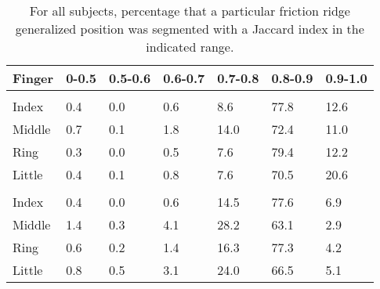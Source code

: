 \documentclass[]{article}
\begin{document}
\begin{table}[!h]

\caption{\label{tab:twoinch-per-frgp-jaccard}For all subjects, percentage that a particular friction ridge generalized position was segmented with a Jaccard index in the indicated range.}
\centering
\begin{tabular}{lllllll}
\toprule
Finger & 0-0.5 & 0.5-0.6 & 0.6-0.7 & 0.7-0.8 & 0.8-0.9 & 0.9-1.0\\
\midrule
\addlinespace[0.3em]
\multicolumn{7}{l}{\textbf{Right}}\\
\rowcolor{gray!6}  \hspace{1em}Index & 0.4 & 0.0 & 0.6 & 8.6 & 77.8 & 12.6\\
\hspace{1em}Middle & 0.7 & 0.1 & 1.8 & 14.0 & 72.4 & 11.0\\
\rowcolor{gray!6}  \hspace{1em}Ring & 0.3 & 0.0 & 0.5 & 7.6 & 79.4 & 12.2\\
\hspace{1em}Little & 0.4 & 0.1 & 0.8 & 7.6 & 70.5 & 20.6\\
\addlinespace[0.3em]
\multicolumn{7}{l}{\textbf{Left}}\\
\rowcolor{gray!6}  \hspace{1em}Index & 0.4 & 0.0 & 0.6 & 14.5 & 77.6 & 6.9\\
\hspace{1em}Middle & 1.4 & 0.3 & 4.1 & 28.2 & 63.1 & 2.9\\
\rowcolor{gray!6}  \hspace{1em}Ring & 0.6 & 0.2 & 1.4 & 16.3 & 77.3 & 4.2\\
\hspace{1em}Little & 0.8 & 0.5 & 3.1 & 24.0 & 66.5 & 5.1\\
\bottomrule
\end{tabular}
\end{table}
\end{document}
